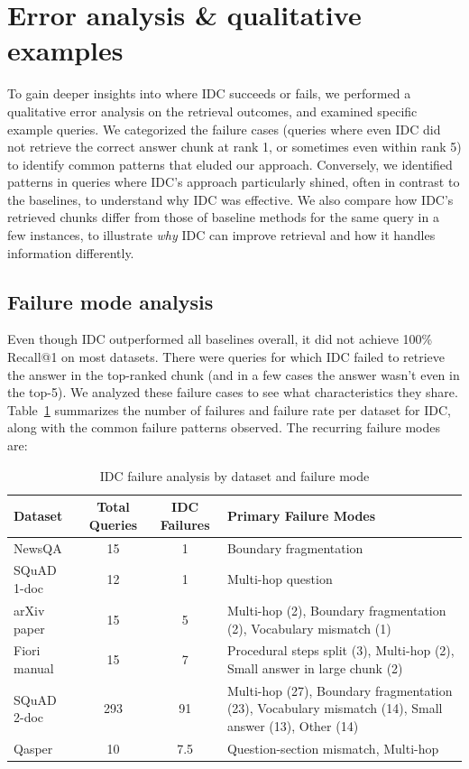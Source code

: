 \documentclass[12pt,a4paper]{report}
\begin{document}
\section{Error analysis \& qualitative examples}\label{sec:error-analysis}

To gain deeper insights into where IDC succeeds or fails, we performed a qualitative error analysis on the retrieval outcomes, and examined specific example queries. We categorized the failure cases (queries where even IDC did not retrieve the correct answer chunk at rank 1, or sometimes even within rank 5) to identify common patterns that eluded our approach. Conversely, we identified patterns in queries where IDC's approach particularly shined, often in contrast to the baselines, to understand why IDC was effective. We also compare how IDC's retrieved chunks differ from those of baseline methods for the same query in a few instances, to illustrate \textit{why} IDC can improve retrieval and how it handles information differently.

\subsection{Failure mode analysis}\label{sec:failure-modes}

Even though IDC outperformed all baselines overall, it did not achieve 100\% Recall@1 on most datasets. There were queries for which IDC failed to retrieve the answer in the top-ranked chunk (and in a few cases the answer wasn't even in the top-5). We analyzed these failure cases to see what characteristics they share. Table~\ref{tab:failure_analysis} summarizes the number of failures and failure rate per dataset for IDC, along with the common failure patterns observed. The recurring failure modes are:

\begin{table}[h!]
\centering
\caption{IDC failure analysis by dataset and failure mode}
\label{tab:failure_analysis}
\scriptsize
\begin{tabularx}{\textwidth}{lccX}
\hline
\textbf{Dataset} & \textbf{Total Queries} & \textbf{IDC Failures} & \textbf{Primary Failure Modes} \\
\hline
NewsQA & 15 & 1 & Boundary fragmentation \\
SQuAD 1-doc & 12 & 1 & Multi-hop question \\
arXiv paper & 15 & 5 & Multi-hop (2), Boundary fragmentation (2), Vocabulary mismatch (1) \\
Fiori manual & 15 & 7 & Procedural steps split (3), Multi-hop (2), Small answer in large chunk (2) \\
SQuAD 2-doc & 293 & 91 & Multi-hop (27), Boundary fragmentation (23), Vocabulary mismatch (14), Small answer (13), Other (14) \\
Qasper & 10 & 7.5 & Question-section mismatch, Multi-hop \\
\hline
\end{tabularx}
\end{table}
\end{document}
